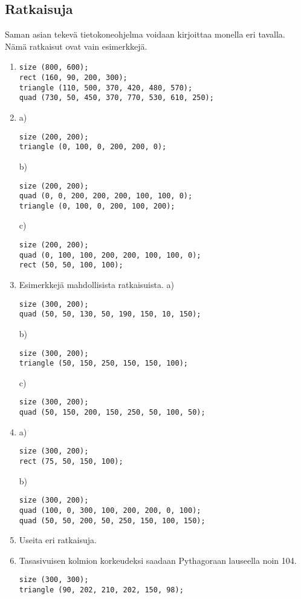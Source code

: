 \documentclass[11pt]{article}
\begin{document}
\subsection*{Ratkaisuja}
\label{sec:org1c0fa1e}
Saman asian tekevä tietokoneohjelma voidaan kirjoittaa monella eri
tavalla. Nämä ratkaisut ovat vain esimerkkejä.
\begin{enumerate}
\item \begin{verbatim}
size (800, 600);
rect (160, 90, 200, 300);
triangle (110, 500, 370, 420, 480, 570);
quad (730, 50, 450, 370, 770, 530, 610, 250);
\end{verbatim}
\item a) 
\begin{verbatim}
size (200, 200);
triangle (0, 100, 0, 200, 200, 0);
\end{verbatim}
b) 
\begin{verbatim}
size (200, 200);
quad (0, 0, 200, 200, 200, 100, 100, 0);
triangle (0, 100, 0, 200, 100, 200);
\end{verbatim}
c) 
\begin{verbatim}
size (200, 200);
quad (0, 100, 100, 200, 200, 100, 100, 0);
rect (50, 50, 100, 100);
\end{verbatim}
\item Esimerkkejä mahdollisista ratkaisuista.
a) 
\begin{verbatim}
size (300, 200);
quad (50, 50, 130, 50, 190, 150, 10, 150);
\end{verbatim}
b) 
\begin{verbatim}
size (300, 200);
triangle (50, 150, 250, 150, 150, 100);
\end{verbatim}
c) 
\begin{verbatim}
size (300, 200);
quad (50, 150, 200, 150, 250, 50, 100, 50);
\end{verbatim}
\item a) 
\begin{verbatim}
size (300, 200);
rect (75, 50, 150, 100);
\end{verbatim}
b) 
\begin{verbatim}
size (300, 200);
quad (100, 0, 300, 100, 200, 200, 0, 100);
quad (50, 50, 200, 50, 250, 150, 100, 150);
\end{verbatim}
\item Useita eri ratkaisuja.
\item Tasasivuisen kolmion korkeudeksi saadaan Pythagoraan lauseella
noin 104.
\begin{verbatim}
size (300, 300);
triangle (90, 202, 210, 202, 150, 98);
\end{verbatim}
\end{enumerate}
\end{document}
